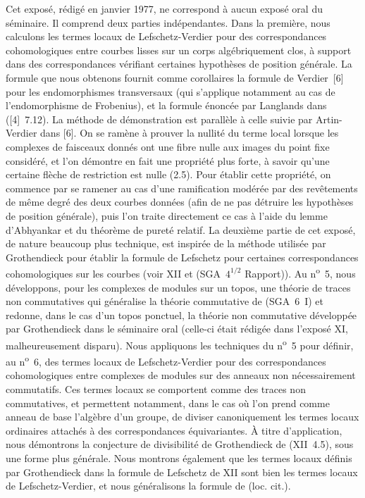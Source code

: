 Cet exposé, rédigé en janvier 1977, ne correspond à aucun exposé oral du séminaire. Il comprend deux parties indépendantes. Dans la première, nous calculons les termes locaux de Lefschetz-Verdier pour des correspondances cohomologiques entre courbes lisses sur un corps algébriquement clos, à support dans des correspondances vérifiant certaines hypothèses de position générale. La formule que nous obtenons fournit comme corollaires la formule de Verdier~[6] pour les endomorphismes transversaux (qui s'applique notamment au cas de l'endomorphisme de Frobenius), et la formule énoncée par Langlands dans ([4]~7.12). La méthode de démonstration est parallèle à celle suivie par Artin-Verdier dans [6]. On se ramène à prouver la nullité du terme local lorsque les complexes de faisceaux donnés ont une fibre nulle aux images du point fixe considéré, et l'on démontre en fait une propriété plus forte, à savoir qu'une certaine flèche de restriction est nulle (2.5). Pour établir cette propriété, on commence par se ramener au cas d'une ramification modérée par des revêtements de même degré des deux courbes données (afin de ne pas détruire les hypothèses de position générale), puis l'on traite directement ce cas à l'aide du lemme d'Abhyankar et du théorème de pureté relatif. La deuxième partie de cet exposé, de nature beaucoup plus technique, est inspirée de la méthode utilisée par Grothendieck pour établir la formule de Lefschetz pour certaines correspondances cohomologiques sur les courbes (voir XII et (SGA~$4^{1/2}$ Rapport)). Au n\textsuperscript{o}~5, nous développons, pour les complexes de modules sur un topos, une théorie de traces non commutatives qui généralise la théorie commutative de (SGA~6~I) et redonne, dans le cas d'un topos ponctuel, la théorie non commutative développée par Grothendieck dans le séminaire oral (celle-ci était rédigée dans l'exposé XI, malheureusement disparu). Nous appliquons les techniques du n\textsuperscript{o}~5 pour définir, au n\textsuperscript{o}~6, des termes locaux de Lefschetz-Verdier pour des correspondances cohomologiques entre complexes de modules sur des
anneaux non nécessairement commutatifs. Ces termes locaux se comportent comme des traces non commutatives, et permettent notamment, dans le cas où l'on prend comme anneau de base l'algèbre d'un groupe, de diviser canoniquement les termes locaux ordinaires attachés à des correspondances équivariantes. À titre d'application, nous démontrons la conjecture de divisibilité de Grothendieck de (XII~4.5), sous une forme plus générale. Nous montrons également que les termes locaux définis par Grothendieck dans la formule de Lefschetz de XII sont bien les termes locaux de Lefschetz-Verdier, et nous généralisons la formule de (loc. cit.).


